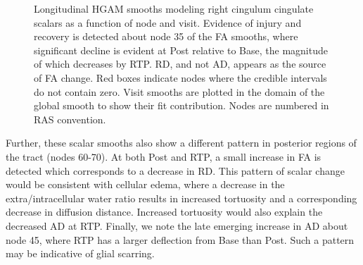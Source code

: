 \documentclass[12pt]{article}
\begin{document}
\begin{figure}[H]
	\centering
	\caption{Longitudinal HGAM smooths modeling right cingulum cingulate scalars as a function of node and visit. Evidence of injury and recovery is detected about node 35 of the FA smooths, where significant decline is evident at Post relative to Base, the magnitude of which decreases by RTP. RD, and not AD, appears as the source of FA change. Red boxes indicate nodes where the credible intervals do not contain zero. Visit smooths are plotted in the domain of the global smooth to show their fit contribution. Nodes are numbered in RAS convention.}
	\label{fig:lgio-gam-recov}
\end{figure}

Further, these scalar smooths also show a different pattern in posterior regions of the tract (nodes 60-70). At both Post and RTP, a small increase in FA is detected which corresponds to a decrease in RD. This pattern of scalar change would be consistent with cellular edema, where a decrease in the extra/intracellular water ratio results in increased tortuosity and a corresponding decrease in diffusion distance. Increased tortuosity would also explain the decreased AD at RTP. Finally, we note the late emerging increase in AD about node 45, where RTP has a larger deflection from Base than Post. Such a pattern may be indicative of glial scarring.
\end{document}
